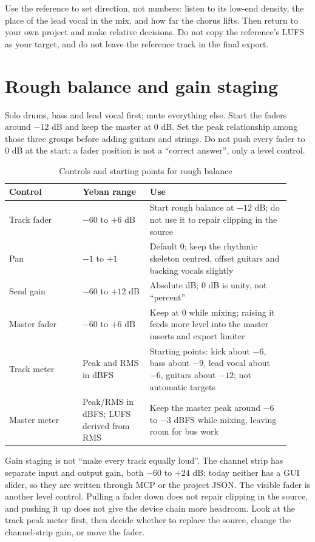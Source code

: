 Use the reference to set direction, not numbers: listen to its low-end density, the place of the lead vocal in the mix, and how far the chorus lifts. Then return to your own project and make relative decisions. Do not copy the reference's LUFS as your target, and do not leave the reference track in the final export.

\section{Rough balance and gain staging}

Solo drums, bass and lead vocal first; mute everything else. Start the faders around $-12$ dB and keep the master at $0$ dB. Set the peak relationship among those three groups before adding guitars and strings. Do not push every fader to $0$ dB at the start: a fader position is not a ``correct answer'', only a level control.

\begin{table}[htbp]
\centering
\small
\begin{tabular}{@{}p{0.24\linewidth}p{0.22\linewidth}p{0.46\linewidth}@{}}
\hline
Control & Yeban range & Use \\
\hline
Track fader & $-60$ to $+6$ dB & Start rough balance at $-12$ dB; do not use it to repair clipping in the source \\
Pan & $-1$ to $+1$ & Default $0$; keep the rhythmic skeleton centred, offset guitars and backing vocals slightly \\
Send gain & $-60$ to $+12$ dB & Absolute dB; $0$ dB is unity, not ``percent'' \\
Master fader & $-60$ to $+6$ dB & Keep at $0$ while mixing; raising it feeds more level into the master inserts and export limiter \\
Track meter & Peak and RMS in dBFS & Starting points: kick about $-6$, bass about $-9$, lead vocal about $-6$, guitars about $-12$; not automatic targets \\
Master meter & Peak/RMS in dBFS; LUFS derived from RMS & Keep the master peak around $-6$ to $-3$ dBFS while mixing, leaving room for bus work \\
\hline
\end{tabular}
\caption{Controls and starting points for rough balance}
\label{tab:walk-controls}
\end{table}

Gain staging is not ``make every track equally loud''. The channel strip has separate input and output gain, both $-60$ to $+24$ dB; today neither has a GUI slider, so they are written through MCP or the project JSON. The visible fader is another level control. Pulling a fader down does not repair clipping in the source, and pushing it up does not give the device chain more headroom. Look at the track peak meter first, then decide whether to replace the source, change the channel-strip gain, or move the fader.

